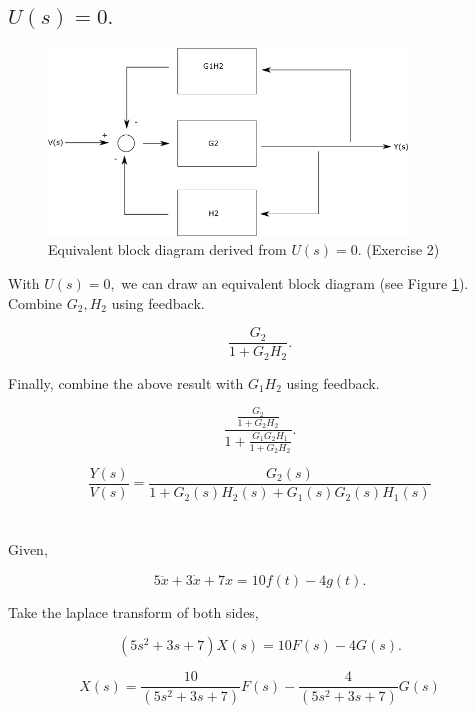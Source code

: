 \documentclass[12pt]{article}
\numberwithin{equation}{section}
\newcommand\ddfrac[2]{\frac{\displaystyle #1}{\displaystyle #2}}
\begin{document}
  \subsection{$ U(s) = 0. $}

  \begin{figure}
    \centering
    \includegraphics[width=0.85\textwidth]{figures/problem2.png}
    \caption{Equivalent block diagram derived from $ U(s) = 0. $ (Exercise 2)}
    \label{fig:problem2}
  \end{figure}

  With $ U(s) = 0, $ we can draw an equivalent block diagram (see Figure \ref{fig:problem2}). Combine $ G_2, H_2 $ using feedback.

  \[
      \frac{G_2}{1 + G_2H_2}
    .\]

  Finally, combine the above result with $ G_1H_2 $ using feedback.

  \[
      \ddfrac{\frac{G_2}{1 + G_2H_2}}{1 + \frac{G_1G_2H_1}{1 + G_2H_2}}
    .\]

  \begin{equation}
    \frac{Y(s)}{V(s)} = \frac{G_2(s)}{1 + G_2(s)H_2(s) + G_1(s)G_2(s)H_1(s)}
  \end{equation}



  \section{}

  Given,

  \[
      5 \ddot x + 3 \dot x + 7 x = 10f(t) - 4g(t)
    .\]

  Take the laplace transform of both sides,

  \[
      \left( 5 s ^2 + 3s + 7 \right) X(s) = 10F(s) - 4G(s)
    .\]

  \begin{equation}\label{eqn:eq1}
    X(s) = \frac{10}{\left( 5 s ^2 + 3s + 7 \right)}F(s) - \frac{4}{\left( 5 s ^2 + 3s + 7 \right)} G(s)
  \end{equation}
\end{document}
